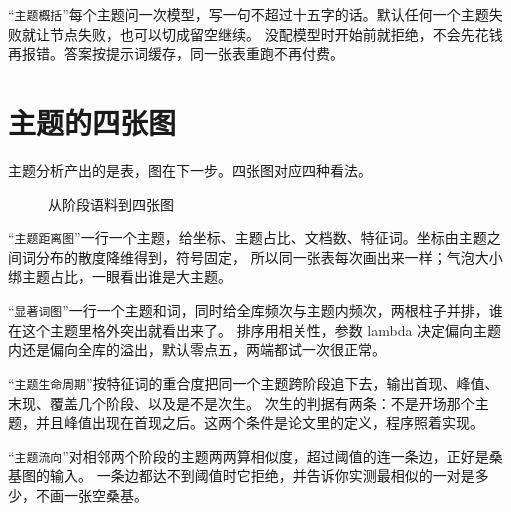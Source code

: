 “\texttt{主题概括}”每个主题问一次模型，写一句不超过十五字的话。默认任何一个主题失败就让节点失败，也可以切成留空继续。
没配模型时开始前就拒绝，不会先花钱再报错。答案按提示词缓存，同一张表重跑不再付费。

\section{主题的四张图}

主题分析产出的是表，图在下一步。四张图对应四种看法。

\begin{figure}[H]\centering
{}
\caption{从阶段语料到四张图}
\label{fig:topic-flow}
\end{figure}

“\texttt{主题距离图}”一行一个主题，给坐标、主题占比、文档数、特征词。坐标由主题之间词分布的散度降维得到，符号固定，
所以同一张表每次画出来一样；气泡大小绑主题占比，一眼看出谁是大主题。

“\texttt{显著词图}”一行一个主题和词，同时给全库频次与主题内频次，两根柱子并排，谁在这个主题里格外突出就看出来了。
排序用相关性，参数 lambda 决定偏向主题内还是偏向全库的溢出，默认零点五，两端都试一次很正常。

“\texttt{主题生命周期}”按特征词的重合度把同一个主题跨阶段追下去，输出首现、峰值、末现、覆盖几个阶段、以及是不是次生。
次生的判据有两条：不是开场那个主题，并且峰值出现在首现之后。这两个条件是论文里的定义，程序照着实现。

“\texttt{主题流向}”对相邻两个阶段的主题两两算相似度，超过阈值的连一条边，正好是桑基图的输入。
一条边都达不到阈值时它拒绝，并告诉你实测最相似的一对是多少，不画一张空桑基。

